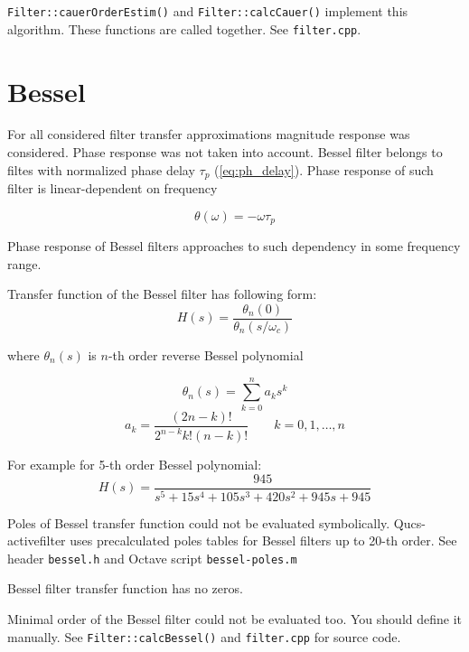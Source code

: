 \verb|Filter::cauerOrderEstim()| and \verb|Filter::calcCauer()| implement this
algorithm. These functions are called together. See \verb|filter.cpp|.

\section{Bessel}

For all considered filter transfer approximations magnitude response was 
considered. Phase response was not taken into account. Bessel filter belongs to 
filtes with normalized phase delay $\tau_p$ (\ref{eq:ph_delay}). Phase response 
of such filter is linear-dependent on frequency

\begin{equation}
 \theta(\omega) = -\omega \tau_p
\end{equation}

Phase response of Bessel filters approaches to such dependency in some 
frequency range.

Transfer function of the Bessel filter has following form:
\begin{equation}
 H(s)=\frac{\theta_n(0)}{\theta_n(s/\omega_c)}
\end{equation}

where $\theta_n(s)$ is $n$-th order reverse Bessel polynomial

\begin{equation}
 \theta_n(s)=\sum_{k=0}^{n}a_ks^k
\end{equation}
\begin{equation}
 a_k=\frac{(2n-k)!}{2^{n-k}k!(n-k)!}\qquad k=0,1,\ldots,n
\end{equation}


For example for 5-th order Bessel polynomial:
\begin{equation}
 H(s)=\frac{945}{s^5+15s^4+105s^3+420s^2+945s+945}
\end{equation}

Poles of Bessel transfer function could not be evaluated symbolically. 
Qucs-activefilter uses precalculated poles tables for Bessel filters up to 
20-th order. See header \verb|bessel.h| and Octave script \verb|bessel-poles.m|

Bessel filter transfer function has no zeros. 

Minimal order of the Bessel filter could not be evaluated too. You should 
define it manually. See \verb|Filter::calcBessel()| and \verb|filter.cpp| for 
source code.




